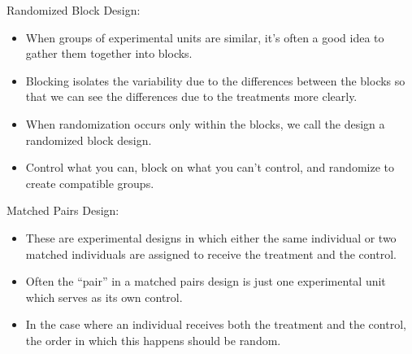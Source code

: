 \documentclass[../stats.tex]{subfiles}
\begin{document}
Randomized Block Design:
\begin{itemize}
    \item When groups of experimental units are similar, it's often a good idea to gather them together into blocks.
    \item Blocking isolates the variability due to the differences between the blocks so that we can see the differences due to the treatments more clearly.
    \item When randomization occurs only within the blocks, we call the design a randomized block design.
    \item Control what you can, block on what you can't control, and randomize to create compatible groups.
\end{itemize}

Matched Pairs Design:
\begin{itemize}
    \item These are experimental designs in which either the same individual or two matched individuals are assigned to receive the treatment and the control.
    \item Often the ``pair'' in a matched pairs design is just one experimental unit which serves as its own control.
    \item In the case where an individual receives both the treatment and the control, the order in which this happens should be random.
\end{itemize}
\end{document}
